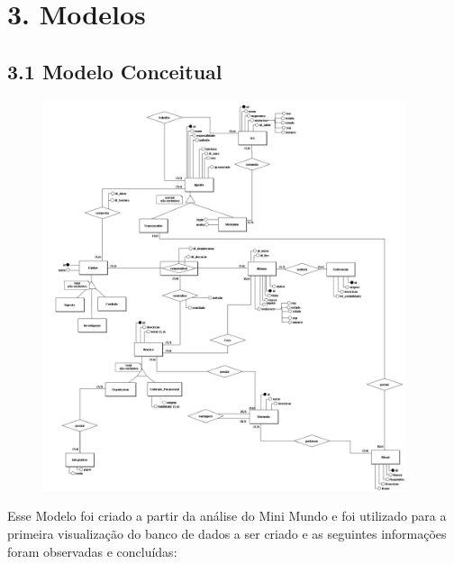 \documentclass[12pt,a4paper]{report}
\begin{document}
\chapter{3. Modelos}

\section{3.1 Modelo Conceitual}
\begin{figure}[ht!]
    \centering
    \includegraphics[width=0.95\textwidth]{Conceitual-ordem.png}
    \label{fig:conceitual-ordem}
\end{figure}

Esse Modelo foi criado a partir da análise do Mini Mundo e foi utilizado para a primeira visualização do banco de dados a ser criado e as seguintes informações foram observadas e concluídas:
\end{document}
